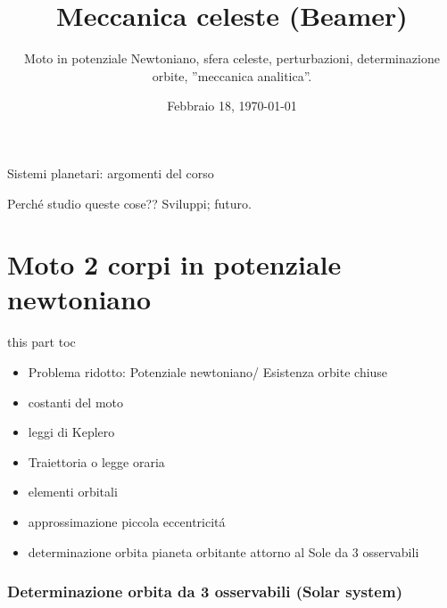 \documentclass[10pt,xcolor={usenames},fleqn,mathserif,serif]{beamer}
\title{Meccanica celeste (Beamer)}
\subtitle{Moto in potenziale Newtoniano, sfera celeste, perturbazioni, determinazione orbite, ''meccanica analitica''.}
\date{Febbraio 18, \today}
\begin{document}

\begin{frame}
  \titlepage
\end{frame}


\begin{frame}[allowframebreaks]{Sistemi planetari: argomenti del corso}
\tableofcontents[onlyparts]
\end{frame}

\begin{wordonframe}{Perch\'e studio queste cose?? Sviluppi; futuro.}

\end{wordonframe}

\part{Moto 2 corpi in potenziale newtoniano}
\begin{frame}{this part toc}
\begin{itemize}
\item Problema ridotto: Potenziale newtoniano/ Esistenza orbite chiuse
\item costanti del moto
\item leggi di Keplero
\item Traiettoria o legge oraria
\item elementi orbitali
\item approssimazione piccola eccentricit\'a
\item determinazione orbita pianeta orbitante attorno al Sole da 3 osservabili
\end{itemize}
\end{frame}
%

\section{Determinazione orbita da 3 osservabili (Solar system)}

\end{document}
